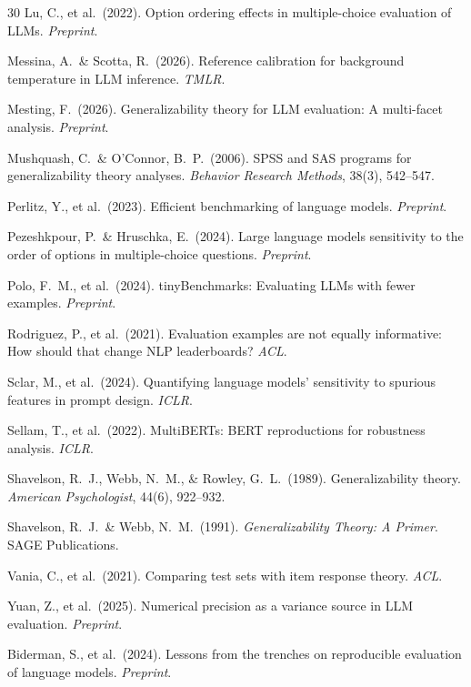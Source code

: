 \documentclass[11pt]{article}
\begin{document}
\begin{thebibliography}{30}
Lu, C., et al.\ (2022).
Option ordering effects in multiple-choice evaluation of LLMs.
\textit{Preprint}.

Messina, A.\ \& Scotta, R.\ (2026).
Reference calibration for background temperature in LLM inference.
\textit{TMLR}.

Mesting, F.\ (2026).
Generalizability theory for LLM evaluation: A multi-facet analysis.
\textit{Preprint}.

Mushquash, C.\ \& O'Connor, B.~P.\ (2006).
SPSS and SAS programs for generalizability theory analyses.
\textit{Behavior Research Methods}, 38(3), 542--547.

Perlitz, Y., et al.\ (2023).
Efficient benchmarking of language models.
\textit{Preprint}.

Pezeshkpour, P.\ \& Hruschka, E.\ (2024).
Large language models sensitivity to the order of options in multiple-choice questions.
\textit{Preprint}.

Polo, F.~M., et al.\ (2024).
tinyBenchmarks: Evaluating LLMs with fewer examples.
\textit{Preprint}.

Rodriguez, P., et al.\ (2021).
Evaluation examples are not equally informative: How should that change NLP leaderboards?
\textit{ACL}.

Sclar, M., et al.\ (2024).
Quantifying language models' sensitivity to spurious features in prompt design.
\textit{ICLR}.

Sellam, T., et al.\ (2022).
MultiBERTs: BERT reproductions for robustness analysis.
\textit{ICLR}.

Shavelson, R.~J., Webb, N.~M., \& Rowley, G.~L.\ (1989).
Generalizability theory.
\textit{American Psychologist}, 44(6), 922--932.

Shavelson, R.~J.\ \& Webb, N.~M.\ (1991).
\textit{Generalizability Theory: A Primer}.
SAGE Publications.

Vania, C., et al.\ (2021).
Comparing test sets with item response theory.
\textit{ACL}.

Yuan, Z., et al.\ (2025).
Numerical precision as a variance source in LLM evaluation.
\textit{Preprint}.

Biderman, S., et al.\ (2024).
Lessons from the trenches on reproducible evaluation of language models.
\textit{Preprint}.

\end{thebibliography}
\end{document}
